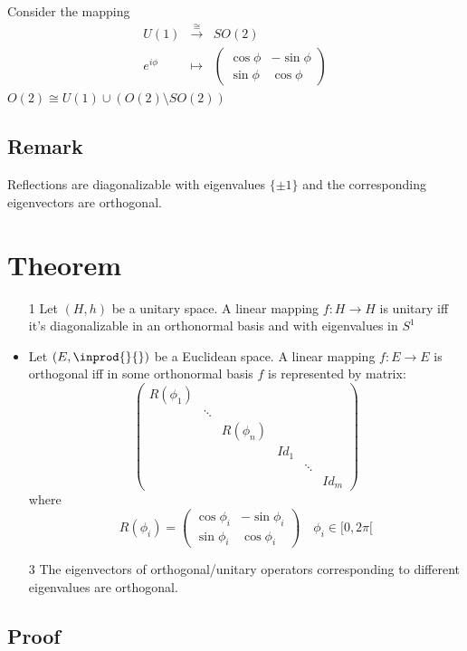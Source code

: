 \documentclass{book}
\newcommand{\leftbracket}{[}
\begin{document}
Consider the mapping$$\begin{aligned}
    U(1) &\stackrel{\cong}\rightarrow&SO(2)\\
    e^{i\phi}&\mapsto&\begin{pmatrix}
        \cos\phi&-\sin\phi\\\sin\phi&\cos\phi
    \end{pmatrix}
\end{aligned}$$
$O(2)\cong U(1)\cup\left(O(2)\setminus SO(2)\right)$
\subsection*{Remark}
Reflections are diagonalizable with eigenvalues $\{\pm 1\}$ and the corresponding eigenvectors are orthogonal.
\section{Theorem}
\begin{itemize}
    \item[1] Let $(H,h)$ be a unitary space. A linear mapping $f:H\rightarrow H$ is unitary iff it's diagonalizable in an orthonormal basis and with eigenvalues in $S^1$
    \item Let $(E,\inprod{}{})$ be a Euclidean space. A linear mapping $f:E\rightarrow E$ is orthogonal iff in some orthonormal basis $f$ is represented by matrix:
    $$\begin{pmatrix}
        R(\phi_1)&&&&&\\
        &\ddots&&&\\
        &&R(\phi_n)&&\\
        &&&Id_1&\\
        &&&&\ddots&\\
        &&&&&Id_m
    \end{pmatrix}$$
    where $$R(\phi_i)=\begin{pmatrix}
        \cos\phi_i&-\sin\phi_i\\\sin\phi_i&\cos\phi_i
    \end{pmatrix}\quad \phi_i\in \leftbracket 0,2\pi\leftbracket$$
    \item[3] The eigenvectors of orthogonal/unitary operators corresponding to different eigenvalues are orthogonal.
\end{itemize}
\subsection*{Proof}
\end{document}
